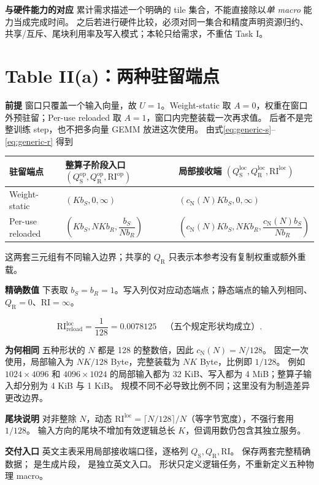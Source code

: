 \documentclass[11pt,a4paper,fontset=fandol]{ctexart}
\newcommand{\RI}{\mathrm{RI}}
\newcommand{\op}{\mathrm{op}}
\newcommand{\loc}{\mathrm{loc}}
\newcommand{\cn}[1]{c_{\mathrm N}\!\left(#1\right)}
\newcommand{\qs}{Q_{\mathrm S}}
\newcommand{\qr}{Q_{\mathrm R}}
\newcommand{\qso}{Q_{\mathrm S}^{\op}}
\newcommand{\qsl}{Q_{\mathrm S}^{\loc}}
\newcommand{\qro}{Q_{\mathrm R}^{\op}}
\newcommand{\qrl}{Q_{\mathrm R}^{\loc}}
\newcommand{\riop}{\RI^{\op}}
\newcommand{\riloc}{\RI^{\loc}}
\newcommand{\para}[1]{\par\smallskip\noindent\textbf{#1}\quad}
\begin{document}
\para{与硬件能力的对应}
累计需求描述一个明确的 tile 集合，不能直接除以\emph{单 macro} 能力当成完成时间。
之后若进行硬件比较，必须对同一集合和精度声明资源归约、共享/互斥、尾块利用率及写入模式；本轮只给需求，不重估 Task I。

\clearpage
\section{Table II(a)：两种驻留端点}
\para{前提}
窗口只覆盖一个输入向量，故 $U=1$。Weight-static 取 $A=0$，权重在窗口外预驻留；Per-use reloaded 取 $A=1$，窗口内完整装载一次再求值。
后者不是完整训练 step，也不把多向量 GEMM 放进这次使用。
由式\eqref{eq:generic-s}--\eqref{eq:generic-r} 得到
\begin{center}\small
\begin{tabular}{@{}lll@{}}\toprule
驻留端点 & 整算子阶段入口 $(\qso,\qro,\riop)$ & 局部接收端 $(\qsl,\qrl,\riloc)$\\\midrule
Weight-static & $(Kb_S,0,\infty)$ & $(\cn{N}Kb_S,0,\infty)$\\[5pt]
Per-use reloaded & $\left(Kb_S,NKb_R,\dfrac{b_S}{Nb_R}\right)$ & $\left(\cn{N}Kb_S,NKb_R,\dfrac{\cn{N}b_S}{Nb_R}\right)$\\\bottomrule
\end{tabular}\end{center}
这两套三元组有不同输入边界；共享的 $\qr$ 只表示本参考没有复制权重或额外重载。

\para{精确数值}
下表取 $b_S=b_R=1$。写入列仅对应动态端点；静态端点的输入列相同、$\qr=0$、$\RI=\infty$。
\begin{center}\small
\end{center}
\begin{equation}
\boxed{\quad \riloc_{\mathrm{reload}}=\frac{1}{128}=0.0078125
\quad\text{（五个规定形状均成立）}.\quad}\label{eq:IIa-ri}
\end{equation}

\para{为何相同}
五种形状的 $N$ 都是 128 的整数倍，因此 $\cn{N}=N/128$。
固定一次使用，局部输入为 $NK/128$ Byte，完整装载为 $NK$ Byte，比例即 $1/128$。
例如 $1024\times4096$ 和 $4096\times1024$ 的局部输入都为 32 KiB、写入都为 4 MiB；整算子输入却分别为 4 KiB 与 1 KiB。
规模不同不必导致比例不同；这里没有为制造差异更改边界。

\para{尾块说明}
对非整除 $N$，动态 $\riloc=\lceil N/128\rceil/N$（等字节宽度），不强行套用 $1/128$。
输入方向的尾块不增加有效逻辑总长 $K$，但调用数仍包含其独立服务。

\para{交付入口}
英文主表采用局部接收端口径，逐格列 $\qs,\qr,\RI$。
 保存两套完整精确数据；
 是生成片段，
 是独立英文入口。
形状只定义逻辑任务，不重新定义五种物理 macro。
\end{document}
